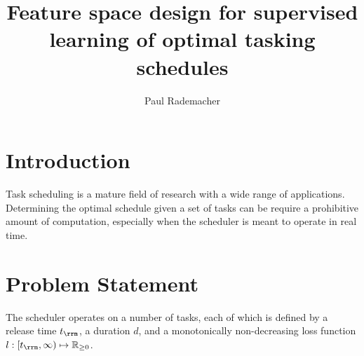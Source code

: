 \documentclass[11pt]{article}
\title{Feature space design for supervised learning of optimal tasking schedules}
\author{Paul Rademacher}
\DeclareMathOperator{\Rbbgeq}{\mathbb{R}_{\geq 0}}
\begin{document}
\maketitle


\section{Introduction}
Task scheduling is a mature field of research with a wide range of applications. Determining the optimal schedule given a set of tasks can be require a prohibitive amount of computation, especially when the scheduler is meant to operate in real time. 


\section{Problem Statement}
The scheduler operates on a number of tasks, each of which is defined by a release time $t_{\rrm}$, a duration $d$, and a monotonically non-decreasing loss function $l: [t_{\rrm}, \infty) \mapsto \Rbbgeq$.



\end{document}
